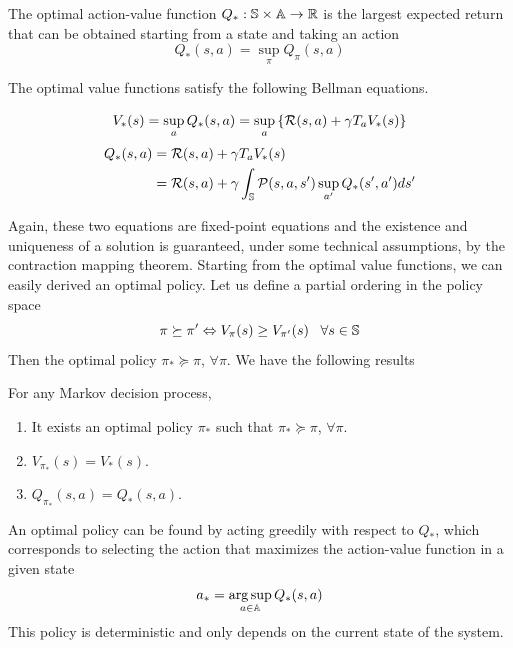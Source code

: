 \begin{definition}
	The optimal action-value function $Q_*: \S \times \A \to \R$ is the largest
	expected return that can be obtained starting from a state and taking an
	action
	\begin{equation}
		Q_*(s,a) = \sup_\pi Q_\pi(s,a)
	\end{equation}
\end{definition}
The optimal value functions satisfy the following Bellman equations.
\begin{proposition}
	\begin{equation}
		V_*(s) = \sup_a Q_*(s,a) = \sup_a \left\{\calR(s,a) + \gamma T_a V_*(s)\right\}
	\end{equation}
	\begin{equation}
		\begin{split}
			Q_*(s,a) &= \calR(s,a) + \gamma T_a V_*(s)\\
					 &= \calR(s,a) + \gamma \int_\S \calP(s,a,s') \sup_{a'} Q_*(s', a') ds'
		\end{split}
	\end{equation}
\end{proposition}
Again, these two equations are fixed-point equations and the existence and
uniqueness of a solution is guaranteed, under some technical assumptions, by 
the contraction mapping theorem. Starting from the optimal value functions, we
can easily derived an optimal policy. Let us define a partial ordering in the 
policy space
\begin{equation}
	\pi \succeq \pi' \Leftrightarrow V_\pi(s) \geq V_{\pi'}(s) \;\;\; \forall s \in \S
\end{equation}
Then the optimal policy $\pi_* \succeq \pi$, $\forall \pi$. We have the
following results
\begin{theorem}
	For any Markov decision process,
	\begin{enumerate}[label={\roman*)}]
		\item It exists an optimal policy $\pi_*$ such that $\pi_* \succeq
			\pi$, $\forall \pi$. 
		\item $V_{\pi_*}(s) = V_*(s)$.
		\item $Q_{\pi_*}(s,a) = Q_*(s,a)$. 
	\end{enumerate}
\end{theorem}
An optimal policy can be found by acting greedily with respect to $Q_*$, which corresponds to selecting the action that maximizes the action-value function in a given state
\begin{equation}
	a_* = \argsup_{a\in\A} Q_*(s,a)
\end{equation}
This policy is deterministic and only depends on the current state of the system.

